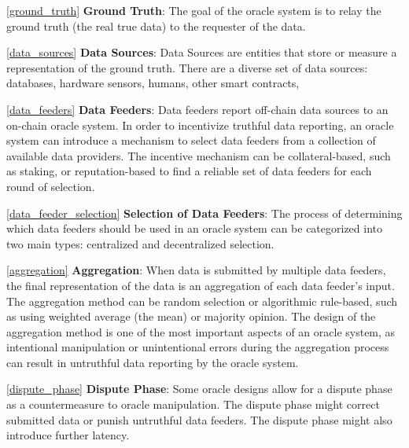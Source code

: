 \begin{description}
	\item \ref{ground_truth} \textbf{Ground Truth}: The goal of the oracle system is to relay the ground truth (\ie the real true data) to the requester of the data. 

	\item \ref{data_sources} \textbf{Data Sources}: Data Sources are entities that store or measure a representation of the ground truth. There are a diverse set of data sources: databases, hardware sensors, humans, other smart contracts, \etc

	\item \ref{data_feeders} \textbf{Data Feeders}: Data feeders report off-chain data sources to an on-chain oracle system. In order to incentivize truthful data reporting, an oracle system can introduce a mechanism to select data feeders from a collection of available data providers. The incentive mechanism can be collateral-based, such as staking, or reputation-based to find a reliable set of data feeders for each round of selection.
	
	\item \ref{data_feeder_selection} \textbf{Selection of Data Feeders}: The process of determining which data feeders should be used in an oracle system can be categorized into two main types: centralized and decentralized selection.

	\item \ref{aggregation} \textbf{Aggregation}: When data is submitted by multiple data feeders, the final representation of the data is an aggregation of each data feeder's input. The aggregation method can be random selection or algorithmic rule-based, such as using weighted average (the mean) or majority opinion. The design of the aggregation method is one of the most important aspects of an oracle system, as intentional manipulation or unintentional errors during the aggregation process can result in untruthful data reporting by the oracle system.
	
	\item \ref{dispute_phase} \textbf{Dispute Phase}: Some oracle designs allow for a dispute phase as a countermeasure to oracle manipulation. The dispute phase might correct submitted data or punish untruthful data feeders. The dispute phase might also introduce further latency.
	
	\end{description}
	

